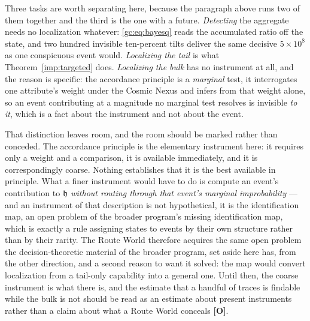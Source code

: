 Three tasks are worth separating here, because the paragraph above runs
two of them together and the third is the one with a future.
\emph{Detecting} the aggregate needs no localization whatever:
\eqref{gc:eq:bayesq} reads the accumulated ratio off the state, and two
hundred invisible ten-percent tilts deliver the same decisive
$5\times10^{8}$ as one conspicuous event would. \emph{Localizing the
tail} is what Theorem~\ref{imp:targeted} does. \emph{Localizing
the bulk} has no instrument at all, and the reason is specific: the
accordance principle is a \emph{marginal} test, it interrogates one
attribute's weight under the Cosmic Nexus and infers from that weight
alone, so an event contributing at a magnitude no marginal test
resolves is invisible \emph{to it}, which is a fact about the instrument
and not about the event.

That distinction leaves room, and the room should be marked rather than
conceded. The accordance principle is the elementary instrument here: it
requires only a weight and a comparison, it is available immediately, and
it is correspondingly coarse. Nothing establishes that it is the best
available in principle. What a finer instrument would have to do is
compute an event's contribution to $\mathfrak{h}$ \emph{without routing through
that event's marginal improbability} --- and an instrument of that
description is not hypothetical, it is
the identification map, an open problem of the broader program's missing identification map, which is exactly a
rule assigning states to events by their own structure rather than by
their rarity. The Route World therefore acquires the same open problem
the decision-theoretic material of the broader program, set aside here has, from the other direction, and a second reason to want
it solved: the map would convert localization from a tail-only
capability into a general one. Until then, the coarse instrument is what
there is, and the estimate that a handful of traces is findable while the
bulk is not should be read as an estimate about present instruments
rather than a claim about what a Route World conceals \textbf{[O]}.

